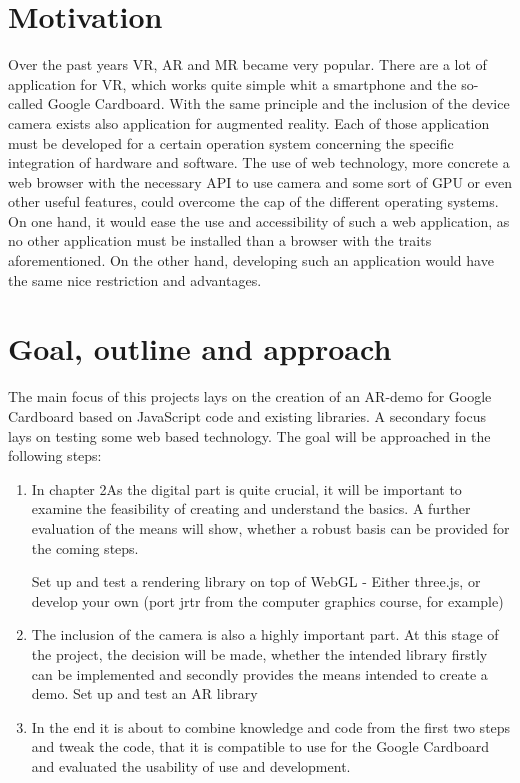 \section{Motivation}

Over the past years VR, AR and MR became very popular. There are a lot of application for VR, which works quite simple whit a smartphone and the so-called Google Cardboard. With the same principle and the inclusion of the device camera exists also application for augmented reality. Each of those application must be developed for a certain operation system concerning the specific integration of hardware and software. 
The use of web technology, more concrete a web browser with the necessary API to use camera and some sort of GPU or even other useful features, could overcome the cap of the different operating systems. On one hand, it would ease the use and accessibility of such a web application, as no other application must be installed than a browser with the traits aforementioned. On the other hand, developing such an application would have the same nice restriction and advantages. 



\section{Goal, outline and approach}

The main focus of this projects lays on the creation of an AR-demo for Google Cardboard based on JavaScript code and existing libraries. A secondary focus lays on testing some web based technology.
The goal will be approached in the following steps:

\begin{enumerate}
    \item In chapter 2As the digital part is quite crucial, it will be important to examine the feasibility of creating and understand the basics. A further evaluation of the means will show, whether a robust basis can be provided for the coming steps.
    
    Set up and test a rendering library on top of WebGL  - Either three.js, or develop your own (port jrtr from the computer graphics course, for example) 
    
    \item The inclusion of the camera is also a highly important part. At this stage of the project, the decision will be made, whether the intended library firstly can be implemented and secondly provides the means intended to create a demo.
    Set up and test an AR library 
    
    \item In the end it is about to combine knowledge and code from the first two steps and tweak the code, that it is compatible to use for the Google Cardboard and evaluated the usability of use and development.
\end{enumerate}


